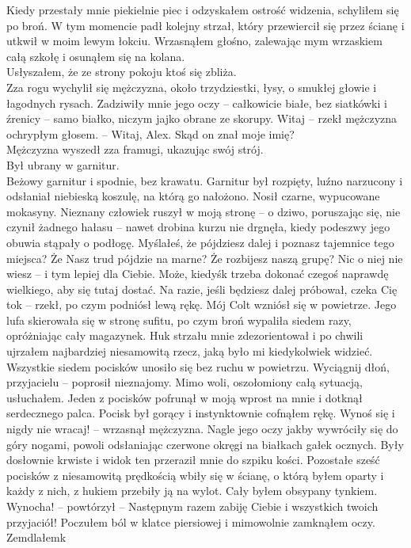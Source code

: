 \documentclass[../MAIN.tex]{subfiles}
\begin{document}
Kiedy przestały mnie piekielnie piec i odzyskałem ostrość widzenia, schyliłem się po broń. W tym momencie padł kolejny strzał, który przewiercił się przez ścianę i utkwił w moim lewym łokciu. Wrzasnąłem głośno, zalewając mym wrzaskiem całą szkołę i osunąłem się na kolana.\\
Usłyszałem, że ze strony pokoju ktoś się zbliża. \\
Zza rogu wychylił się mężczyzna, około trzydziestki, łysy, o smukłej głowie i łagodnych rysach. Zadziwiły mnie jego oczy -- całkowicie białe, bez siatkówki i źrenicy -- samo białko, niczym jajko obrane ze skorupy.
%
\sx Witaj -- rzekł mężczyzna ochrypłym głosem. -- Witaj, Alex.
\qd
Skąd on znał moje imię? \\
Mężczyzna wyszedł zza framugi, ukazując swój strój. \\
Był ubrany w garnitur. \\
Beżowy garnitur i spodnie, bez krawatu. Garnitur był rozpięty, luźno narzucony i odsłaniał niebieską koszulę, na którą go nałożono. Nosił czarne, wypucowane mokasyny. Nieznany człowiek ruszył w moją stronę -- o dziwo, poruszając się, nie czynił żadnego hałasu -- nawet drobina kurzu nie drgnęła, kiedy podeszwy jego obuwia stąpały o podłogę.
%
\sx Myślałeś, że pójdziesz dalej i poznasz tajemnice tego miejsca? Że Nasz trud pójdzie na marne? Że rozbijesz naszą grupę? Nic o niej nie wiesz -- i tym lepiej dla Ciebie. Może, kiedyś\3k trzeba dokonać czegoś naprawdę wielkiego, aby się tutaj dostać. Na razie, jeśli będziesz dalej próbował, czeka Cię to\3k -- rzekł, po czym podniósł lewą rękę.
\qd
Mój Colt wzniósł się w powietrze. Jego lufa skierowała się w stronę sufitu, po czym broń wypaliła siedem razy, opróżniając cały magazynek. Huk strzału mnie zdezorientował i po chwili ujrzałem najbardziej niesamowitą rzecz, jaką było mi kiedykolwiek widzieć. \\
Wszystkie siedem pocisków unosiło się bez ruchu w powietrzu.
%
\sx Wyciągnij dłoń, przyjacielu -- poprosił nieznajomy.
\qd
Mimo woli, oszołomiony całą sytuacją, usłuchałem. Jeden z pocisków pofrunął w moją wprost na mnie i dotknął serdecznego palca. Pocisk był gorący i instynktownie cofnąłem rękę.
%
\sx Wynoś się i nigdy nie wracaj! -- wrzasnął mężczyzna.
\qd
Nagle jego oczy jakby wywróciły się do góry nogami, powoli odsłaniając czerwone okręgi na białkach gałek ocznych. Były dosłownie krwiste i widok ten przeraził mnie do szpiku kości.
Pozostałe sześć pocisków z niesamowitą prędkością wbiły się w ścianę, o którą byłem oparty i każdy z nich, z hukiem przebiły ją na wylot. Cały byłem obsypany tynkiem.
%
\sx Wynocha! -- powtórzył -- Następnym razem zabiję Ciebie i wszystkich twoich przyjaciół!
\qd
Poczułem ból w klatce piersiowej i mimowolnie zamknąłem oczy.\\
Zemdlałem\3k
\end{document}
